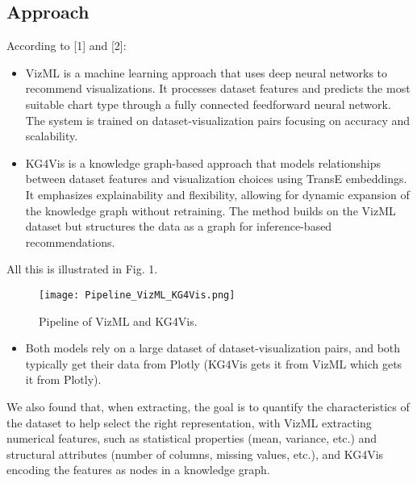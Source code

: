 \subsection{Approach}
According to [1] and [2]:
\begin{itemize}
\item VizML is a machine learning approach that uses deep neural networks to recommend visualizations. It processes dataset features and predicts the most suitable chart type through a fully connected feedforward neural network. The system is trained on dataset-visualization pairs focusing on accuracy and scalability.

\item KG4Vis is a knowledge graph-based approach that models relationships between dataset features and visualization choices using TransE embeddings. It emphasizes explainability and flexibility, allowing for dynamic expansion of the knowledge graph without retraining. The method builds on the VizML dataset but structures the data as a graph for inference-based recommendations. 
\end{itemize}

All this is illustrated in Fig. 1.


\vspace{0.1cm}



\begin{figure}[h]
    \centering
    \texttt{[image: Pipeline\_VizML\_KG4Vis.png]}
    \caption{Pipeline of VizML and KG4Vis.}  
    \label{fig:pipelineVizMLKG4Vis}               
\end{figure}
\vspace{0.3cm}
\begin{itemize}
\item Both models rely on a large dataset of dataset-visualization pairs, and both typically get their data from Plotly (KG4Vis gets it from VizML which gets it from Plotly).

\end{itemize}
We also found that, when extracting, the goal is to quantify the characteristics of the dataset to help select the right representation, with VizML extracting numerical features, such as statistical properties (mean, variance, etc.) and structural attributes (number of columns, missing values, etc.), and KG4Vis encoding the features as nodes in a knowledge graph.

